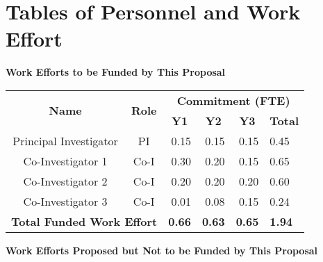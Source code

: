\documentclass[oneside,12pt]{article}
\begin{document}
    \section{Tables of Personnel and Work Effort}

    \bigskip
    \renewcommand{\arraystretch}{1.2}

    \begin{center}
        \textbf{Work Efforts to be Funded by This Proposal}
        \vspace{-1em}
    \end{center}

    \begin{table}[h]
        \centering
        \begin{tabular}{|c|c|r|r|r|l|}
            \hline
            \multirow{2}{*}{\textbf{Name}} & \multirow{2}{*}{\textbf{Role}} & \multicolumn{4}{c|}{\textbf{Commitment (FTE)}} \\
            \cline{3-6}
            & & \multicolumn{1}{c|}{\textbf{Y1}} & \multicolumn{1}{c|}{\textbf{Y2}} & \multicolumn{1}{c|}{\textbf{Y3}} & \multicolumn{1}{c|}{\textbf{Total}} \\
            \hline
            Principal Investigator & PI   & 0.15 & 0.15 & 0.15 & 0.45 \\
            Co-Investigator 1      & Co-I & 0.30 & 0.20 & 0.15 & 0.65 \\
            Co-Investigator 2      & Co-I & 0.20 & 0.20 & 0.20 & 0.60 \\
            Co-Investigator 3      & Co-I & 0.01 & 0.08 & 0.15 & 0.24 \\
            \hline
            \multicolumn{2}{|l|}{\textbf{Total Funded Work Effort}} & \textbf{0.66} & \textbf{0.63} & \textbf{0.65} & \textbf{1.94} \\
            \hline
        \end{tabular}
    \end{table}

    \vspace{1em}

    \begin{center}
        \textbf{Work Efforts Proposed but Not to be Funded by This Proposal}
        \vspace{-1em}
    \end{center}
\end{document}
